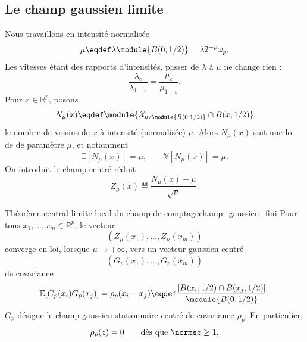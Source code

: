 \subsection{Le champ gaussien limite}

Nous travaillons en intensité normalisée
\[
    \mu \eqdef \lambda \module{B(0,1/2)}  = \lambda 2^{-p}\omega_p .
\]
Les vitesses étant des rapports d'intensités, passer de $\lambda$ à $\mu$ ne change rien :
\[
    \frac{\lambda_c}{\lambda_{1-\varepsilon}}
    =
    \frac{\mu_c}{\mu_{1-\varepsilon}}.
\]
Pour $x\in\mathbb R^p$, posons
\[
    N_\mu(x)
    \eqdef
    \module{\mathcal X_{\mu/\module{B(0,1/2)}}\cap B(x,1/2)}
\]
le nombre de voisins de $x$ à intensité (normalisée) $\mu$.
Alors $N_\mu(x)$ suit une loi de  de paramètre $\mu$, et notamment
\[
    \mathbb E[N_\mu(x)]=\mu,
    \qquad
    \mathbb V[N_\mu(x)]=\mu.
\]
On introduit le champ centré réduit
\[
    Z_\mu(x)
    \eqdef
    \frac{N_\mu(x)-\mu}{\sqrt\mu}.
\]

\begin{Fait}{Théorème central limite local du champ de comptage}{champ_gaussien_fini}
Pour tous $x_1,\ldots,x_m\in\mathbb R^p$, le vecteur
\[
    \left(Z_\mu(x_1),\ldots,Z_\mu(x_m)\right)
\]
converge en loi, lorsque $\mu\to+\infty$, vers un vecteur gaussien centré
\[
    \left(G_p(x_1),\ldots,G_p(x_m)\right)
\]
de covariance
\[
    \mathbb E[G_p(x_i)G_p(x_j)]
    =
    \rho_p(x_i-x_j)
    \eqdef
    \frac{|B(x_i,1/2)\cap B(x_j,1/2)|}{\module{B(0,1/2)}}.
\]
$G_p$ désigne le champ gaussien stationnaire centré de covariance $\rho_p$. En particulier,
\[
    \rho_p(z)=0
    \qquad\text{dès que }\norme z\ge1.
\]
\end{Fait}

